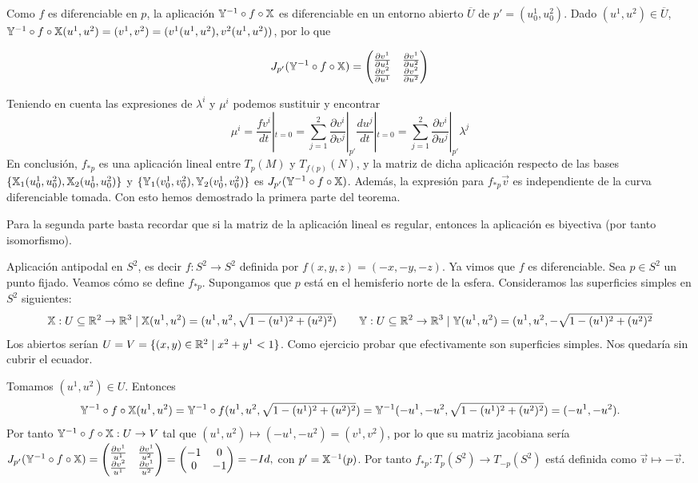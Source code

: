 \documentclass[GAP.tex]{subfiles}
\begin{document}
\begin{dem}[Teorema 17]
Como $f$ es diferenciable en $p$, la aplicación $\mathbb{Y}^{-1}\circ f\circ\mathbb{X}$ es diferenciable en un entorno abierto $\overline{U}$ de $p'=(u^1_0,u^2_0)$. Dado $(u^1,u^2)\in\overline{U}$, $\mathbb{Y}^{-1}\circ f\circ\mathbb{X}(u^1,u^2)=(v^1,v^2)=(v^1(u^1,u^2),v^2(u^1,u^2))$, por lo que

$$J_{p'}(\mathbb{Y}^{-1}\circ f\circ\mathbb{X})=\begin{pmatrix}
\frac{\partial v^1}{\partial u^1} & \frac{\partial v^1}{\partial u^2}\\
\frac{\partial v^2}{\partial u^1} & \frac{\partial v^2}{\partial u^2}
\end{pmatrix}$$

Teniendo en cuenta las expresiones de $\lambda^i$ y $\mu^i$ podemos sustituir y encontrar
$$\mu^i=\frac{fv^i}{dt}|_{t=0}=\sum_{j=1}^2\frac{\partial v^i}{\partial v^j}|_{p'}\frac{du^j}{dt}|_{t=0}=\sum_{j=1}^2\frac{\partial v^i}{\partial u^j}|_{p'}\lambda^j$$
En conclusión, $f_{*p}$ es una aplicación lineal entre $T_p(M)$ y $T_{f(p)}(N)$, y la matriz de dicha aplicación respecto de las bases $\{\mathbb{X}_1(u^1_0,u^2_0),\mathbb{X}_2(u^1_0, u^2_0)\}$ y $\{\mathbb{Y}_1(v^1_0,v^2_0),\mathbb{Y}_2(v^1_0,v^2_0)\}$ es $J_{p'}(\mathbb{Y}^{-1}\circ f\circ\mathbb{X})$. Además, la expresión para $f_{*p}\vec{v}$ es independiente de la curva diferenciable tomada. Con esto hemos demostrado la primera parte del teorema.

Para la segunda parte basta recordar que si la matriz de la aplicación lineal es regular, entonces la aplicación es biyectiva (por tanto isomorfismo). \QED

\end{dem}

\begin{ej}
Aplicación antipodal en $S^2$, es decir $f:S^2\to S^2$ definida por $f(x,y,z)=(-x,-y,-z)$. Ya vimos que $f$ es diferenciable. Sea $p\in S^2$ un punto fijado. Veamos cómo se define $f_{*p}$. Supongamos que $p$ está en el hemisferio norte de la esfera. Consideramos las superficies simples en $S^2$ siguientes:
$$\mathbb{X}:U\subseteq\mathbb{R}^2\to\mathbb{R}^3\mid \mathbb{X}(u^1,u^2)=(u^1,u^2,\sqrt{1-(u^1)^2+(u^2)^2})\quad\quad \mathbb{Y}:U\subseteq\mathbb{R}^2\to\mathbb{R}^3\mid \mathbb{Y}(u^1,u^2)=(u^1,u^2,-\sqrt{1-(u^1)^2+(u^2)^2}$$
Los abiertos serían $U=V=\{(x,y)\in\mathbb{R}^2\mid x^2+y^1<1\}$. Como ejercicio probar que efectivamente son superficies simples. Nos quedaría sin cubrir el ecuador.

Tomamos $(u^1,u^2)\in U$. Entonces $$\mathbb{Y}^{-1}\circ f\circ \mathbb{X}(u^1,u^2)=\mathbb{Y}^{-1}\circ f(u^1,u^2,\sqrt{1-(u^1)^2+(u^2)^2})=\mathbb{Y}^{-1}(-u^1,-u^2,\sqrt{1-(u^1)^2+(u^2)^2})=(-u^1,-u^2).$$
Por tanto $\mathbb{Y}^{-1}\circ f\circ \mathbb{X}:U\to V$ tal que $(u^1,u^2)\mapsto (-u^1,-u^2)=(v^1,v^2)$, por lo que su matriz jacobiana sería
$J_{p'}(\mathbb{Y}^{-1}\circ f\circ \mathbb{X})=\begin{pmatrix}
\frac{\partial v^1}{u^1}	& \frac{\partial v^1}{u^2}\\
\frac{\partial v^2}{u^1}	& \frac{\partial v^1}{u^2}
\end{pmatrix}=\begin{pmatrix}
-1	& 0\\
0	& -1
\end{pmatrix}=-Id,$ con $p'=\mathbb{X}^{-1}(p)$. Por tanto $f_{*p}:T_p(S^2)\to T_{-p}(S^2)$ está definida como $\vec{v}\mapsto -\vec{v}$.
\end{ej}
\end{document}
